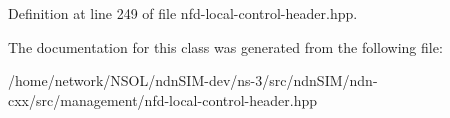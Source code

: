 Definition at line 249 of file nfd-\/local-\/control-\/header.\+hpp.



The documentation for this class was generated from the following file\+:\begin{DoxyCompactItemize}
\item 
/home/network/\+N\+S\+O\+L/ndn\+S\+I\+M-\/dev/ns-\/3/src/ndn\+S\+I\+M/ndn-\/cxx/src/management/nfd-\/local-\/control-\/header.\+hpp\end{DoxyCompactItemize}
